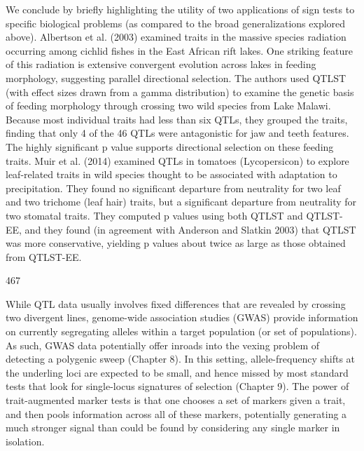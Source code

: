 \documentclass{article}
\begin{document}
We conclude by briefly highlighting the utility of two applications of sign tests to specific biological problems (as compared to the broad generalizations explored above). Albertson et al. (2003) examined traits in the massive species radiation occurring among cichlid fishes in the East African rift lakes. One striking feature of this radiation is extensive convergent evolution across lakes in feeding morphology, suggesting parallel directional selection. The authors used QTLST (with effect sizes drawn from a gamma distribution) to examine the genetic basis of feeding morphology through crossing two wild species from Lake Malawi. Because most individual traits had less than six QTLs, they grouped the traits, finding that only 4 of the 46 QTLs were antagonistic for jaw and teeth features. The highly significant p value supports directional selection on these feeding traits. Muir et al. (2014) examined QTLs in tomatoes (Lycopersicon) to explore leaf-related traits in wild species thought to be associated with adaptation to precipitation. They found no significant departure from neutrality for two leaf and two trichome (leaf hair) traits, but a significant departure from neutrality for two stomatal traits. They computed p values using both QTLST and QTLST-EE, and they found (in agreement with Anderson and Slatkin 2003) that QTLST was more conservative, yielding p values about twice as large as those obtained from QTLST-EE.

467

While QTL data usually involves fixed differences that are revealed by crossing two divergent lines, genome-wide association studies (GWAS) provide information on currently segregating alleles within a target population (or set of populations). As such, GWAS data potentially offer inroads into the vexing problem of detecting a polygenic sweep (Chapter 8). In this setting, allele-frequency shifts at the underling loci are expected to be small, and hence missed by most standard tests that look for single-locus signatures of selection (Chapter 9). The power of trait-augmented marker tests is that one chooses a set of markers given a trait, and then pools information across all of these markers, potentially generating a much stronger signal than could be found by considering any single marker in isolation.
\end{document}
